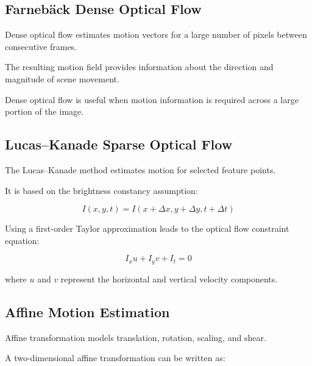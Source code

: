 \documentclass[11pt,a4paper]{article}
\begin{document}

\subsection{Farnebäck Dense Optical Flow}

Dense optical flow estimates motion vectors for a large number of pixels between consecutive frames.

The resulting motion field provides information about the direction and magnitude of scene movement.

Dense optical flow is useful when motion information is required across a large portion of the image.


\subsection{Lucas--Kanade Sparse Optical Flow}

The Lucas--Kanade method estimates motion for selected feature points.

It is based on the brightness constancy assumption:

\begin{equation}
I(x,y,t)=I(x+\Delta x,y+\Delta y,t+\Delta t)
\end{equation}

Using a first-order Taylor approximation leads to the optical flow constraint equation:

\begin{equation}
I_xu+I_yv+I_t=0
\end{equation}

where $u$ and $v$ represent the horizontal and vertical velocity components.


\subsection{Affine Motion Estimation}

Affine transformation models translation, rotation, scaling, and shear.

A two-dimensional affine transformation can be written as:
\end{document}
